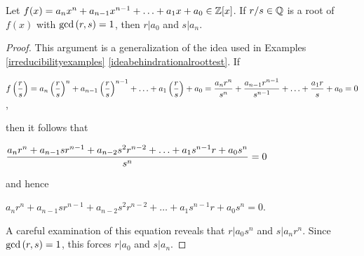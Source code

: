 \documentclass[11pt,fleqn,dvipsnames,usenames]{article}
\begin{document}
%
\begin{theorem}\label{rationalroottest}
Let $f(x) = a_{n}x^{n} + a_{n-1}x^{n-1} + \ldots + a_{1}x + a_{0}\in\mathbb{Z}[x]$.  If $r/s\in \mathbb{Q}$ is a root of $f(x)$ with $\text{gcd}\left(r,s\right) = 1$, then $r|a_{0}$ and $s|a_{n}$.
\end{theorem}
%
\begin{proof}
This argument is a generalization of the idea used in Examples \ref{irreducibilityexamples} \ref{ideabehindrationalroottest}.  If
\begin{center}
$\displaystyle{f\left(\frac{r}{s}\right) = a_{n}\left(\frac{r}{s}\right)^{n} + a_{n-1}\left(\frac{r}{s}\right)^{n-1} + \ldots + a_{1}\left(\frac{r}{s}\right) + a_{0} = \frac{a_{n}r^{n}}{s^{n}} + \frac{a_{n-1}r^{n-1}}{s^{n-1}} + \ldots + \frac{a_{1}r}{s} + a_{0} = 0}$,
\end{center}
then it follows that
\begin{center}
$\displaystyle{\frac{a_{n}r^{n} + a_{n-1}sr^{n-1} + a_{n-2}s^{2}r^{n-2} + \ldots + a_{1}s^{n-1}r + a_{0}s^{n}}{s^{n}}} = 0$
\end{center}
and hence
\begin{center}
$a_{n}r^{n} + a_{n-1}sr^{n-1} + a_{n-2}s^{2}r^{n-2} + \ldots + a_{1}s^{n-1}r + a_{0}s^{n} = 0$.
\end{center}
A careful examination of this equation reveals that $r|a_{0}s^{n}$ and $s|a_{n}r^{n}$.  Since $\text{gcd}\left(r,s\right) = 1$, this forces $r|a_{0}$ and $s|a_{n}$.
\end{proof}
%
\end{document}
